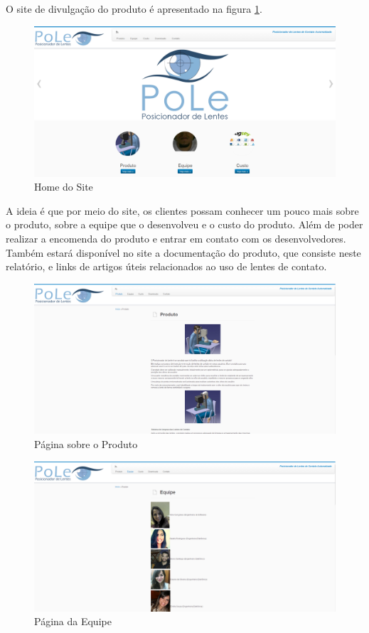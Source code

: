 O site de divulgação do produto é apresentado na figura \ref{site1}.

\begin{figure}[H]
		\centering
			\includegraphics[scale=0.3]{figuras/site1.png}
		\caption{Home do Site}
		\label{site1}
\end{figure}

A ideia é que por meio do site, os clientes possam conhecer um pouco mais sobre o produto, sobre a equipe que o desenvolveu e o custo do produto. Além de poder realizar a encomenda do produto e entrar em contato com os desenvolvedores. Também estará disponível no site a documentação do produto, que consiste neste relatório, e links de artigos úteis relacionados ao uso de lentes de contato.

\begin{figure}[H]
		\centering
			\includegraphics[scale=0.3]{figuras/site5.png}
		\caption{Página sobre o Produto}
		\label{site5}
\end{figure}


\begin{figure}[H]
		\centering
			\includegraphics[scale=0.3]{figuras/site4.png}
		\caption{Página da Equipe}
		\label{site4}
\end{figure}


